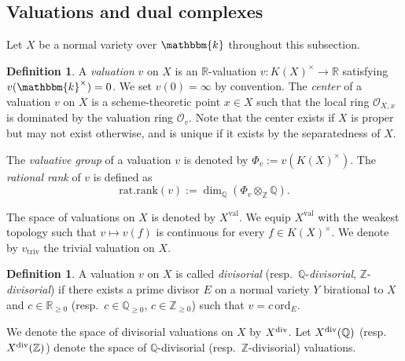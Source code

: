 \documentclass[reqno, 12pt]{amsart}
\theoremstyle{definition}
\newtheorem{defn}[prop]{Definition}
\newtheorem{rem}[prop]{\it Remark}
\newcommand{\bR}{\mathbb{R}}
\newcommand{\bQ}{\mathbb{Q}}
\newcommand{\bZ}{\mathbb{Z}}
\newcommand{\bk}{\mathbbm{k}}
\newcommand{\cO}{\mathcal{O}}
\newcommand{\ord}{\mathrm{ord}}
\newcommand{\triv}{\mathrm{triv}}
\newcommand{\val}{\mathrm{val}}
\newcommand{\ratrank}{\mathrm{rat.rank}}
\numberwithin{equation}{section}
\begin{document}

\subsection{Valuations and dual complexes}


Let $X$ be a normal variety over $\bk$ throughout this subsection.

\begin{defn}
A \emph{valuation} $v$ on $X$ is an $\bR$-valuation $v: K(X)^{\times}\to \bR$ satisfying $v(\bk^{\times}) = 0$. We set $v(0) = \infty$ by convention. The \emph{center} of a valuation $v$ on $X$ is a scheme-theoretic point $x\in X$ such that the local ring $\cO_{X,x}$ is dominated by the valuation ring $\cO_v$. Note that the center exists if $X$ is proper but may not exist otherwise, and is unique if it exists by the separatedness of $X$.

The \emph{valuative group} of a valuation $v$ is denoted by $\Phi_v:= v(K(X)^{\times})$. The \emph{rational rank} of $v$ is defined as 
\[
\ratrank(v):= \dim_{\bQ}(\Phi_v\otimes_{\bZ}\bQ).
\]

The space of valuations on $X$ is denoted by $X^{\val}$. We equip $X^{\val}$ with the weakest topology such that $v\mapsto v(f)$ is continuous for every $f\in K(X)^{\times}$. We denote by $v_{\triv}$ the trivial valuation on $X$.
\end{defn}

\begin{defn}
A valuation $v$ on $X$ is called \emph{divisorial} (resp.\ $\bQ$-\emph{divisorial}, $\bZ$-\emph{divisorial}) if there exists a prime divisor $E$ on a normal variety $Y$ birational to $X$ and $c\in \bR_{\geq 0}$ (resp.\ $c\in \bQ_{\geq 0}$, $c\in \bZ_{\geq 0}$) such that $v = c\,\ord_E$. 

We denote the space of divisorial valuations on $X$ by $X^{\rm div}$. Let $X^{\rm div}(\bQ)$ (resp.\ $X^{\rm div}(\bZ)$) denote the space of $\bQ$-divisorial (resp.\ $\bZ$-divisorial) valuations.
\end{defn}
\end{document}
